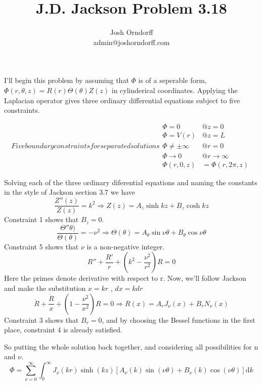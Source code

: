 \documentclass[10pt,a4paper]{article}
\begin{document}
\title{J.D. Jackson Problem 3.18}
\author{Josh Orndorff \\ admin@joshorndorff.com}
\maketitle

I'll begin this problem by assuming that $\Phi$ is of a seperable form, $\Phi (r,\theta,z) = R(r)\Theta(\theta)Z(z)$ in cylinderical coordinates.  Applying the Laplacian operator gives three ordinary differential equations subject to five constraints.

\begin{subequations}
Five boundary constraints for separated solutions
\begin{align}
       \Phi=0 &@ z=0 \\
       \Phi=V(r) &@ z=L \\
       \Phi\neq \pm\infty &@ r=0 \\
       \Phi\rightarrow0 &@ r\rightarrow\infty \\
       \Phi(r,0,z)&=\Phi(r,2\pi,z)
\end{align}
\end{subequations}

Solving each of the three ordinary diferential equations and naming the constants in the style of Jackson section 3.7 we have
\begin{equation}
\frac{Z''(z)}{Z(z)}=k^2 \Rightarrow Z(z)=A_z\sinh kz + B_z \cosh kz
\end{equation}
Constraint 1 shows that $B_z = 0$.
\begin{equation}
\frac{\Theta''\theta)}{\Theta(\theta)}=-\nu^2 \Rightarrow \Theta(\theta)=A_\theta\sin \nu\theta + B_\theta \cos \nu\theta
\end{equation}
Constraint 5 shows that $\nu$ is a non-negative integer.
\begin{equation}
R''+\frac{R'}{r}+\left(k^2-\frac{\nu^2}{r^2}\right)R=0
\end{equation}
Here the primes denote derivative with respect to r.  Now, we'll follow Jackson and make the substitution $x=kr$ , $dx=k dr$
\begin{equation}
\ddot{R}+\frac{\dot{R}}{x}+\left(1-\frac{\nu^2}{x^2}\right)R=0 \Rightarrow R(x)=A_rJ_\nu(x)+B_rN_\nu(x)
\end{equation}
Constraint 3 shows that $B_r=0$, and by choosing the Bessel functions in the first place, constraint 4 is already satisfied.

So putting the whole solution back together, and considering all possibilities for n and $\nu$.
\begin{equation}
\Phi=\sum_{\nu=0}^\infty\int_0^\infty J_\nu(kr)\sinh(kz)
\left[A_{\nu}(k)\sin(\nu\theta)+B_{\nu}(k)\cos(\nu\theta)\right]\mathrm{d}k
\end{equation}
\end{document}
